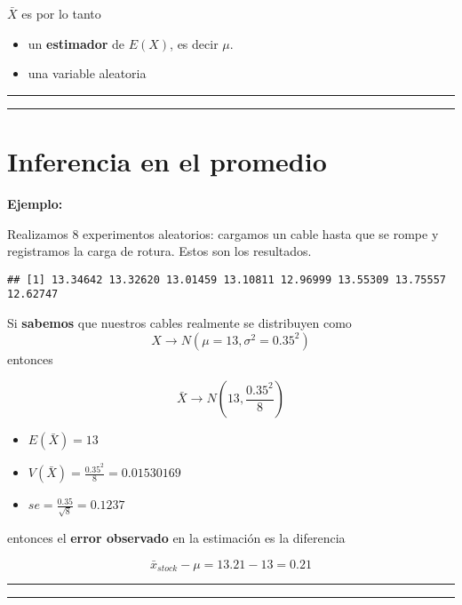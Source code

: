 \documentclass[
]{book}
\providecommand{\tightlist}{%
  \setlength{\itemsep}{0pt}\setlength{\parskip}{0pt}}
\begin{document}
\(\bar{X}\) es por lo tanto

\begin{itemize}
\item
  un \textbf{estimador} de \(E(X)\), es decir \(\mu\).
\item
  una variable aleatoria
\end{itemize}

\begin{center}\rule{0.5\linewidth}{0.5pt}\end{center}

\begin{center}\rule{0.5\linewidth}{0.5pt}\end{center}

\hypertarget{inferencia-en-el-promedio}{%
\section{Inferencia en el promedio}\label{inferencia-en-el-promedio}}

\textbf{Ejemplo:}

Realizamos \(8\) experimentos aleatorios: cargamos un cable hasta que se rompe y registramos la carga de rotura. Estos son los resultados.

\begin{verbatim}
## [1] 13.34642 13.32620 13.01459 13.10811 12.96999 13.55309 13.75557 12.62747
\end{verbatim}

Si \textbf{sabemos} que nuestros cables realmente se distribuyen como \[X \rightarrow N(\mu=13, \sigma^2=0.35^2)\] entonces

\[\bar{X} \rightarrow N(13, \frac{0.35^2}{8})\]

\begin{itemize}
\tightlist
\item
  \(E(\bar{X})=13\)
\item
  \(V(\bar{X})=\frac{0.35^2}{8}=0.01530169\)
\item
  \(se=\frac{0.35}{\sqrt{8}}=0.1237\)
\end{itemize}

entonces el \textbf{error observado} en la estimación es la diferencia

\[\bar{x}_{stock}-\mu=13.21-13=0.21\]

\begin{center}\rule{0.5\linewidth}{0.5pt}\end{center}

\begin{center}\rule{0.5\linewidth}{0.5pt}\end{center}
\end{document}
